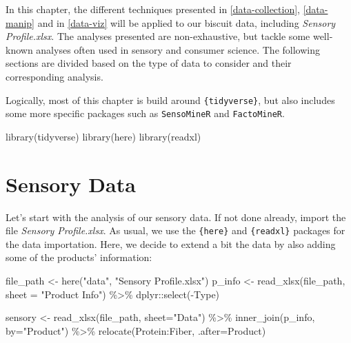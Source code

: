 \documentclass[
]{book}
\newenvironment{Shaded}{\begin{snugshade}}{\end{snugshade}}
\newcommand{\AttributeTok}[1]{\textcolor[rgb]{0.77,0.63,0.00}{#1}}
\newcommand{\FunctionTok}[1]{\textcolor[rgb]{0.00,0.00,0.00}{#1}}
\newcommand{\NormalTok}[1]{#1}
\newcommand{\OtherTok}[1]{\textcolor[rgb]{0.56,0.35,0.01}{#1}}
\newcommand{\SpecialCharTok}[1]{\textcolor[rgb]{0.00,0.00,0.00}{#1}}
\newcommand{\StringTok}[1]{\textcolor[rgb]{0.31,0.60,0.02}{#1}}
\begin{document}
In this chapter, the different techniques presented in \ref{data-collection}, \ref{data-manip} and in \ref{data-viz} will be applied to our biscuit data, including \emph{Sensory Profile.xlsx}.
The analyses presented are non-exhaustive, but tackle some well-known analyses often used in sensory and consumer science.
The following sections are divided based on the type of data to consider and their corresponding analysis.

Logically, most of this chapter is build around \texttt{\{tidyverse\}}, but also includes some more specific packages such as \texttt{SensoMineR} and \texttt{FactoMineR}.

\begin{Shaded}
\begin{Highlighting}[]
\FunctionTok{library}\NormalTok{(tidyverse)}
\FunctionTok{library}\NormalTok{(here)}
\FunctionTok{library}\NormalTok{(readxl)}
\end{Highlighting}
\end{Shaded}

\hypertarget{sensory-data}{%
\section{Sensory Data}\label{sensory-data}}

Let's start with the analysis of our sensory data. If not done already, import the file \emph{Sensory Profile.xlsx}.
As usual, we use the \texttt{\{here\}} and \texttt{\{readxl\}} packages for the data importation. Here, we decide to extend a bit the data by also adding some of the products' information:

\begin{Shaded}
\begin{Highlighting}[]
\NormalTok{file\_path }\OtherTok{\textless{}{-}} \FunctionTok{here}\NormalTok{(}\StringTok{"data"}\NormalTok{, }\StringTok{"Sensory Profile.xlsx"}\NormalTok{) }
\NormalTok{p\_info }\OtherTok{\textless{}{-}} \FunctionTok{read\_xlsx}\NormalTok{(file\_path, }\AttributeTok{sheet =} \StringTok{"Product Info"}\NormalTok{) }\SpecialCharTok{\%\textgreater{}\%} 
\NormalTok{  dplyr}\SpecialCharTok{::}\FunctionTok{select}\NormalTok{(}\SpecialCharTok{{-}}\NormalTok{Type)}

\NormalTok{sensory }\OtherTok{\textless{}{-}} \FunctionTok{read\_xlsx}\NormalTok{(file\_path, }\AttributeTok{sheet=}\StringTok{"Data"}\NormalTok{) }\SpecialCharTok{\%\textgreater{}\%} 
  \FunctionTok{inner\_join}\NormalTok{(p\_info, }\AttributeTok{by=}\StringTok{"Product"}\NormalTok{) }\SpecialCharTok{\%\textgreater{}\%} 
  \FunctionTok{relocate}\NormalTok{(Protein}\SpecialCharTok{:}\NormalTok{Fiber, }\AttributeTok{.after=}\NormalTok{Product)}
\end{Highlighting}
\end{Shaded}
\end{document}
